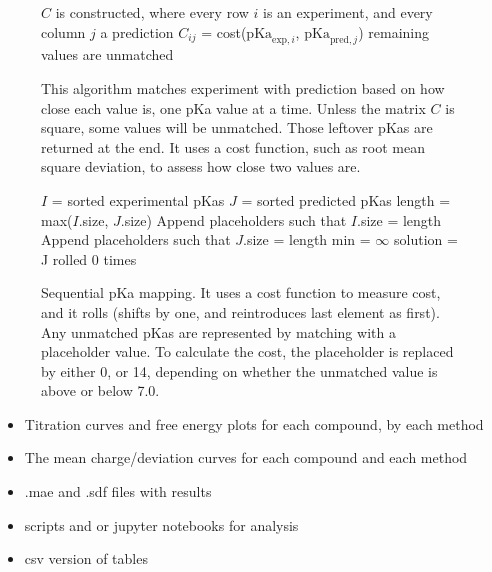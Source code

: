 \documentclass[9pt,lineno,final]{elife}
\newcommand{\pKa}{\mathrm{pKa}}
\begin{document}


\begin{figure}

\begin{algorithm}[H]
	\SetAlgoLined
	\caption{This algorithm matches experiment with prediction based on how close each value is, one pKa value at a time. Unless the matrix $C$ is square, some values will be unmatched. Those leftover pKas are returned at the end. It uses a cost function, such as root mean square deviation, to assess how close two values are.}
	\label{alg:closest}
	 
	$C$ is constructed, where every row  $i$ is an experiment, and every column $j$ a prediction\;
	$C_{ij}$ = cost($\pKa_{\text{exp},i}$, $\pKa_{\text{pred},j}$)\;
	remaining values are unmatched\;
\label{alg:closest}
\end{algorithm}
\end{figure}

\begin{figure}
	\begin{algorithm}[H]
		\SetAlgoLined
		\caption{Sequential pKa mapping. It uses a cost function to measure cost, and it rolls (shifts by one, and reintroduces last element as first). Any unmatched pKas are represented by matching with a placeholder value. To calculate the cost, the placeholder is replaced by either 0, or 14, depending on whether the unmatched value is above or below 7.0.}
		\label{alg:sequential}
		 
		$I$ = sorted experimental pKas \;
		$J$ = sorted predicted pKas \;
		length = max($I$.size, $J$.size)\;
		Append placeholders such that $I$.size = length \;
		Append placeholders such that $J$.size = length \;
		min = $\infty$\;
		solution = J rolled 0 times\;
	\end{algorithm}
\end{figure}

\begin{itemize}
	\item Titration curves and free energy plots for each compound, by each method
	\item The mean charge/deviation curves for each compound and each method
	\item .mae and .sdf files with results
	\item scripts and or jupyter notebooks for analysis
	\item csv version of tables
\end{itemize}
\end{document}
